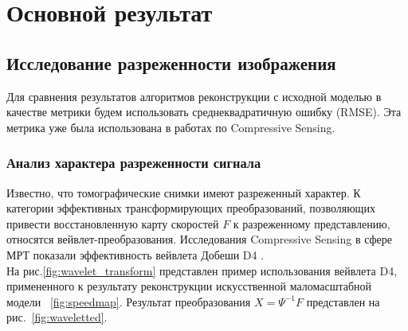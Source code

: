 \documentclass[14pt]{matmex-diploma}
\begin{document}
\section{Основной результат} \label{sec:main_result}
\subsection{Исследование разреженности изображения}
Для сравнения результатов алгоритмов реконструкции с исходной моделью в качестве метрики будем использовать среднеквадратичную ошибку (RMSE). Эта метрика уже была использована в работах по Compressive Sensing. 



\subsubsection{Анализ характера разреженности сигнала} \label{sec:s_analysis}
Известно, что томографические снимки имеют разреженный характер. К категории эффективных трансформирующих преобразований, позволяющих привести восстановленную карту скоростей $F$ к разреженному представлению, относятся вейвлет-преобразования. Исследования Compressive Sensing в сфере МРТ показали эффективность вейвлета Добеши D4 \cite{lustig2007sparse}. \\
На рис.\ref{fig:wavelet_transform} представлен пример использования вейвлета D4, примененного к результату реконструкции искусственной маломасштабной модели ~\ref{fig:speedmap}. Результат преобразования $X = \Psi^{-1} F$ представлен на рис.~\ref{fig:waveletted}.\\
\end{document}
